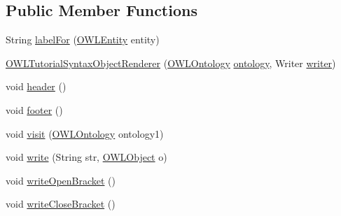 \subsection*{Public Member Functions}
\begin{DoxyCompactItemize}
\item 
String \hyperlink{classuk_1_1ac_1_1manchester_1_1owl_1_1owlapi_1_1tutorial_1_1io_1_1_o_w_l_tutorial_syntax_object_renderer_ad56ae83c82974eee9fbb56d813e1baac}{label\-For} (\hyperlink{interfaceorg_1_1semanticweb_1_1owlapi_1_1model_1_1_o_w_l_entity}{O\-W\-L\-Entity} entity)
\item 
\hyperlink{classuk_1_1ac_1_1manchester_1_1owl_1_1owlapi_1_1tutorial_1_1io_1_1_o_w_l_tutorial_syntax_object_renderer_ad8c05494515c1a9657fdf14cba0abdac}{O\-W\-L\-Tutorial\-Syntax\-Object\-Renderer} (\hyperlink{interfaceorg_1_1semanticweb_1_1owlapi_1_1model_1_1_o_w_l_ontology}{O\-W\-L\-Ontology} \hyperlink{classuk_1_1ac_1_1manchester_1_1owl_1_1owlapi_1_1tutorial_1_1io_1_1_o_w_l_tutorial_syntax_object_renderer_a11b35b33a51b17845ddec91d8e61958e}{ontology}, Writer \hyperlink{classuk_1_1ac_1_1manchester_1_1owl_1_1owlapi_1_1tutorial_1_1io_1_1_o_w_l_tutorial_syntax_object_renderer_ab482bfbe8cd84b9426edb5cdea576ef6}{writer})
\item 
void \hyperlink{classuk_1_1ac_1_1manchester_1_1owl_1_1owlapi_1_1tutorial_1_1io_1_1_o_w_l_tutorial_syntax_object_renderer_ace2d5836144b4b21ca3fd4ff7edd7fa0}{header} ()
\item 
void \hyperlink{classuk_1_1ac_1_1manchester_1_1owl_1_1owlapi_1_1tutorial_1_1io_1_1_o_w_l_tutorial_syntax_object_renderer_a16d3b374132c522950f1433d761a94eb}{footer} ()
\item 
void \hyperlink{classuk_1_1ac_1_1manchester_1_1owl_1_1owlapi_1_1tutorial_1_1io_1_1_o_w_l_tutorial_syntax_object_renderer_aab712d462c707fdb69edfde06c62a4a7}{visit} (\hyperlink{interfaceorg_1_1semanticweb_1_1owlapi_1_1model_1_1_o_w_l_ontology}{O\-W\-L\-Ontology} ontology1)
\item 
void \hyperlink{classuk_1_1ac_1_1manchester_1_1owl_1_1owlapi_1_1tutorial_1_1io_1_1_o_w_l_tutorial_syntax_object_renderer_a30140cbef43e53d0a8047705c6f933c2}{write} (String str, \hyperlink{interfaceorg_1_1semanticweb_1_1owlapi_1_1model_1_1_o_w_l_object}{O\-W\-L\-Object} o)
\item 
void \hyperlink{classuk_1_1ac_1_1manchester_1_1owl_1_1owlapi_1_1tutorial_1_1io_1_1_o_w_l_tutorial_syntax_object_renderer_af5fc7c6569f58363118d1ad6da1bc827}{write\-Open\-Bracket} ()
\item 
void \hyperlink{classuk_1_1ac_1_1manchester_1_1owl_1_1owlapi_1_1tutorial_1_1io_1_1_o_w_l_tutorial_syntax_object_renderer_abcd6eaa0ad77082b1138b3a92ec0b063}{write\-Close\-Bracket} ()

\end{DoxyCompactItemize}
